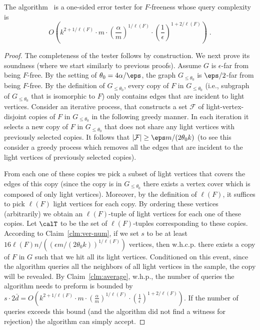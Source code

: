 \begin{theorem}\label{thm:Gen-F-ub}
The algorithm \TestFfree\ is a one-sided error tester for $F$-freeness whose query complexity is $$O\left(k^{2+1/\ell(F)} \cdot m \cdot \left(\frac{\alpha}{m }\right)^{1/\ell(F)} \cdot \left(\frac{1}{\epsilon}\right)^{1+2/\ell(F)}\right)\;.$$
\end{theorem}

\begin{proof}
The completeness of the tester follows by construction.
We next prove its soundness (where we start similarly to previous proofs). Assume $G$ is $\epsilon$-far from being $F$-free.
By the setting of $\theta_0 = 4\alpha/\eps$, the graph $G_{\leq \theta_0}$ is $\eps/2$-far from being $F$-free. By the definition of $G_{\leq \theta_0}$, every copy of $F$ in $G_{\leq \theta_0}$ (i.e.,  subgraph of $G_{\leq \theta_0}$ that is isomorphic to $F$) only contains edges that are incident to light vertices.
Consider an iterative process, that constructs a set $\mathcal{F}$ of light-vertex-disjoint copies of $F$ in $G_{\leq \theta_0}$ in the following greedy manner. In each iteration it selects a new copy of $F$ in $G_{\leq \theta_0}$ that does not share any light vertices with previously selected copies. 
It follows that $|\mathcal{F}| \geq \eps m/ (2\theta_0 k)$ (to see this consider a greedy process which removes all the edges that are incident to the light vertices of previously selected copies). %

From each one of these copies we pick a subset of light vertices that covers the edges of this copy (since the copy is in $G_{\leq \theta_0}$ there exists a vertex cover which is composed of only light vertices).
Moreover, by the definition of $\ell(F)$, it suffices to pick $\ell(F)$ light vertices for each copy.
By ordering these vertices (arbitrarily) we obtain an $\ell(F)$-tuple of light vertices for each one of these copies.
Let $\calT$ to be the set of $\ell(F)$-tuples corresponding to these copies. According to Claim~\ref{clm:ver-num}, if we set $s$ to be at least $16 \ell(F) n / ((\epsilon m/ (2\theta_0 k))^{1/\ell(F)})$ vertices, then w.h.c.p. there exists a copy of $F$ in $G$ such that we hit all its light vertices. Conditioned on this event, since the algorithm queries all the neighbors of all light vertices in the sample, the copy will be revealed.
By Claim~\ref{clm:average}, w.h.p., the number of queries the algorithm needs to preform is bounded by $s \cdot 2\bar{d} = O\left(k^{2+1/\ell(F)} \cdot m \cdot \left(\frac{\alpha}{m }\right)^{1/\ell(F)} \cdot \left(\frac{1}{\epsilon}\right)^{1+2/\ell(F)}\right)$. If the number of queries exceeds this bound (and the algorithm did not find a witness for rejection) the algorithm can simply accept. 
\end{proof}

